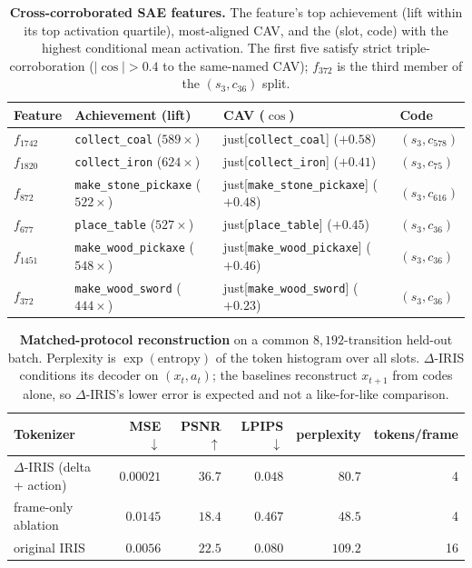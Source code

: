 \documentclass[11pt]{article}
\newcommand{\deltairis}{$\Delta$-IRIS}
\newcommand{\code}[2]{(s_{#1},c_{#2})}
\newcommand{\achname}[1]{\texttt{#1}}
\begin{document}
\begin{table}[h]
\centering
\caption{\textbf{Cross-corroborated SAE features.} The feature's top achievement (lift within its top activation quartile), most-aligned CAV, and the (slot, code) with the highest conditional mean activation. The first five satisfy strict triple-corroboration ($|\cos|>0.4$ to the same-named CAV); $f_{372}$ is the third member of the $\code{3}{36}$ split.}\label{stab:sae}
\begin{tabular}{@{}llll@{}}
\toprule
Feature & Achievement (lift) & CAV ($\cos$) & Code \\
\midrule
$f_{1742}$ & \achname{collect\_coal} ($589\times$) & just[\achname{collect\_coal}] ($+0.58$) & $\code{3}{578}$ \\
$f_{1820}$ & \achname{collect\_iron} ($624\times$) & just[\achname{collect\_iron}] ($+0.41$) & $\code{3}{75}$ \\
$f_{872}$  & \achname{make\_stone\_pickaxe} ($522\times$) & just[\achname{make\_stone\_pickaxe}] ($+0.48$) & $\code{3}{616}$ \\
$f_{677}$  & \achname{place\_table} ($527\times$) & just[\achname{place\_table}] ($+0.45$) & $\code{3}{36}$ \\
$f_{1451}$ & \achname{make\_wood\_pickaxe} ($548\times$) & just[\achname{make\_wood\_pickaxe}] ($+0.46$) & $\code{3}{36}$ \\
$f_{372}$  & \achname{make\_wood\_sword} ($444\times$) & just[\achname{make\_wood\_sword}] ($+0.23$) & $\code{3}{36}$ \\
\bottomrule
\end{tabular}
\end{table}

\begin{table}[h]
\centering
\caption{\textbf{Matched-protocol reconstruction} on a common $8{,}192$-transition held-out batch. Perplexity is $\exp(\text{entropy})$ of the token histogram over all slots. \deltairis{} conditions its decoder on $(x_t,a_t)$; the baselines reconstruct $x_{t+1}$ from codes alone, so \deltairis{}'s lower error is expected and not a like-for-like comparison.}\label{stab:recon}
\begin{tabular}{@{}lrrrrr@{}}
\toprule
Tokenizer & MSE $\downarrow$ & PSNR $\uparrow$ & LPIPS $\downarrow$ & perplexity & tokens/frame \\
\midrule
\deltairis{} (delta + action) & $0.00021$ & $36.7$ & $0.048$ & $80.7$ & 4 \\
frame-only ablation           & $0.0145$  & $18.4$ & $0.467$ & $48.5$ & 4 \\
original IRIS                  & $0.0056$  & $22.5$ & $0.080$ & $109.2$ & 16 \\
\bottomrule
\end{tabular}
\end{table}
\end{document}
